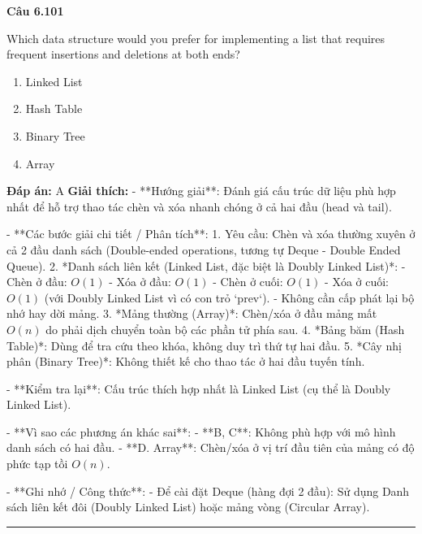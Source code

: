 \documentclass[11pt,a4paper]{article}
\newenvironment{question}[1]{%
  \par\vspace{1em}\noindent\textbf{\large Câu #1}\par\vspace{0.4em}
}{%
  \par\vspace{1em}\hrule\vspace{0.6em}
}
\newenvironment{choices}{%
  \begin{enumerate}[label=\textbf{\Alph*.},leftmargin=2.2em,itemsep=2pt,topsep=3pt]
}{%
  \end{enumerate}
}
\newcommand{\choice}{\item}
\begin{document}
\begin{question}{6.101}
Which data structure would you prefer for implementing a list that requires frequent insertions and deletions at both ends?
\begin{choices}
\choice Linked List
\choice Hash Table
\choice Binary Tree
\choice Array
\end{choices}
\textbf{Đáp án:} A
\textbf{Giải thích:} - **Hướng giải**:
  Đánh giá cấu trúc dữ liệu phù hợp nhất để hỗ trợ thao tác chèn và xóa nhanh chóng ở cả hai đầu (head và tail).

- **Các bước giải chi tiết / Phân tích**:
  1. Yêu cầu: Chèn và xóa thường xuyên ở cả 2 đầu danh sách (Double-ended operations, tương tự Deque - Double Ended Queue).
  2. *Danh sách liên kết (Linked List, đặc biệt là Doubly Linked List)*:
     - Chèn ở đầu: \(O(1)\)
     - Xóa ở đầu: \(O(1)\)
     - Chèn ở cuối: \(O(1)\)
     - Xóa ở cuối: \(O(1)\) (với Doubly Linked List vì có con trỏ `prev`).
     - Không cần cấp phát lại bộ nhớ hay dời mảng.
  3. *Mảng thường (Array)*: Chèn/xóa ở đầu mảng mất \(O(n)\) do phải dịch chuyển toàn bộ các phần tử phía sau.
  4. *Bảng băm (Hash Table)*: Dùng để tra cứu theo khóa, không duy trì thứ tự hai đầu.
  5. *Cây nhị phân (Binary Tree)*: Không thiết kế cho thao tác ở hai đầu tuyến tính.

- **Kiểm tra lại**:
  Cấu trúc thích hợp nhất là Linked List (cụ thể là Doubly Linked List).

- **Vì sao các phương án khác sai**:
  - **B, C**: Không phù hợp với mô hình danh sách có hai đầu.
  - **D. Array**: Chèn/xóa ở vị trí đầu tiên của mảng có độ phức tạp tồi \(O(n)\).

- **Ghi nhớ / Công thức**:
  - Để cài đặt Deque (hàng đợi 2 đầu): Sử dụng Danh sách liên kết đôi (Doubly Linked List) hoặc mảng vòng (Circular Array).
\end{question}
\end{document}

